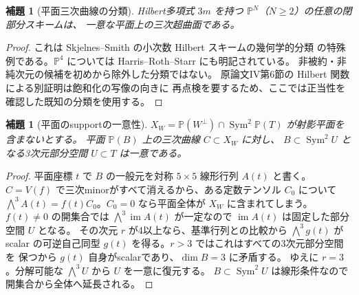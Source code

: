 \documentclass[11pt,a4paper]{ltjsarticle}
\newtheorem{lemma}[theorem]{補題}
\newcommand{\PP}{\mathbb P}
\newcommand{\Sym}{\operatorname{Sym}}
\begin{document}
\begin{lemma}[平面三次曲線の分類]\label{lem:plane3restored}
Hilbert多項式 $3m$ を持つ $\PP^N$（$N\ge2$）の任意の閉部分スキームは、
一意な平面上の三次超曲面である。
\end{lemma}
\begin{proof}
これは Skjelnes--Smith の小次数 Hilbert スキームの幾何学的分類
\cite{SkjelnesSmith} の特殊例である。$\PP^4$ については
Harris--Roth--Starr \cite[\S3.2]{HarrisRothStarr} にも明記されている。
非被約・非純次元の候補を初めから除外した分類ではない。
原論文IV第6節の Hilbert 関数による別証明は飽和化の写像の向きに
再点検を要するため、ここでは正当性を確認した既知の分類を使用する。
\end{proof}

\begin{lemma}[平面のsupportの一意性]\label{lem:plane-support-restored}
$X_W=\PP(W^\perp)\cap\Sym^2\PP(T)$ が射影平面を含まないとする。
平面 $\PP(B)$ 上の三次曲線 $C\subset X_W$ に対し、
$B\subset\Sym^2U$ となる3次元部分空間 $U\subset T$ は一意である。
\end{lemma}
\begin{proof}
平面座標 $t$ で $B$ の一般元を対称 $5\times5$ 線形行列 $A(t)$ と書く。
$C=V(f)$ で三次minorがすべて消えるから、ある定数テンソル $C_0$ について
$\bigwedge^3A(t)=f(t)C_0$。$C_0=0$ なら平面全体が $X_W$ に含まれてしまう。
$f(t)\ne0$ の開集合では $\bigwedge^3\operatorname{im}A(t)$ が一定なので
$\operatorname{im}A(t)$ は固定した部分空間 $U$ となる。
その次元 $r$ が4以上なら、基準行列との比較から $\bigwedge^3g(t)$ が
scalar の可逆自己同型 $g(t)$ を得る。$r>3$ ではこれはすべての3次元部分空間を
保つから $g(t)$ 自身がscalarであり、$\dim B=3$ に矛盾する。
ゆえに $r=3$。分解可能な $\bigwedge^3U$ から $U$ を一意に復元する。
$B\subset\Sym^2U$ は線形条件なので開集合から全体へ延長される。
\end{proof}
\end{document}
